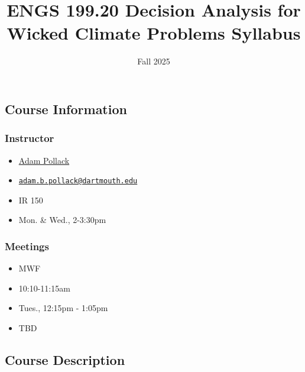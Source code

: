 \documentclass[
  11pt,
]{article}
\title{ENGS 199.20 Decision Analysis for Wicked Climate Problems
Syllabus}
\subtitle{Fall 2025}
\author{}
\date{}
\providecommand{\tightlist}{%
  \setlength{\itemsep}{0pt}\setlength{\parskip}{0pt}}\usepackage{longtable,booktabs,array}
\begin{document}
\maketitle


\subsection{Course Information}\label{course-information}

\subsubsection{Instructor}\label{instructor}

\begin{itemize}
\tightlist
\item
   \href{https://abpoll.github.io}{Adam Pollack}
\item
  \href{mailto:adam.b.pollack@dartmouth.edu}{\nolinkurl{adam.b.pollack@dartmouth.edu}}
\item
   IR 150
\item
   Mon. \& Wed., 2-3:30pm
\end{itemize}

\subsubsection{Meetings}\label{meetings}

\begin{itemize}
\tightlist
\item
   MWF
\item
   10:10-11:15am
\item
   Tues., 12:15pm - 1:05pm
\item
   TBD
\end{itemize}

\subsection{Course Description}\label{course-description}
\end{document}
